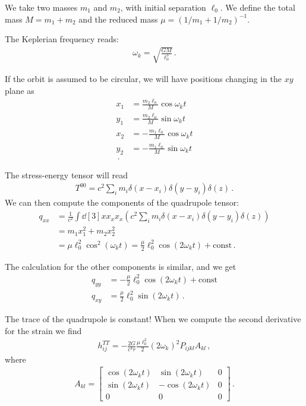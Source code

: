 \documentclass[main.tex]{subfiles}
\begin{document}
We take two masses \(m_1 \) and \(m_2 \), with initial separation \(\ell_0\). 
We define the total mass \(M = m_1 + m_2 \) and the reduced mass \(\mu = (1/m_1 + 1/m_2 )^{-1}\). 

The Keplerian frequency reads: 
%
\begin{align}
\omega _k = \sqrt{ \frac{GM}{\ell_0^3}}
\,.
\end{align}

If the orbit is assumed to be circular, we will have positions changing in the \(xy\) plane
as 
%
\begin{align}
x_1 &= \frac{m_2 \ell_0 }{M} \cos \omega _k t \\
y_1 &= \frac{m_2 \ell_0 }{M} \sin \omega _k t \\
x_2 &= -\frac{m_1 \ell_0 }{M} \cos \omega _k t \\
y_2 &= -\frac{m_1 \ell_0 }{M} \sin \omega _k t \\
\,.
\end{align}

The stress-energy tensor will read 
%
\begin{align}
T^{00} = c^2 \sum _{i} m_i \delta(x - x_i) \delta (y- y_i) \delta (z)
\,.
\end{align}
%
We can then compute the components of the quadrupole tensor:
%
\begin{align}
q_{xx} &= \frac{1}{c^2} \int \dd[3]{x} x_x x_x \left( c^2 \sum _{i} m_i \delta(x - x_i) \delta (y- y_i) \delta (z) \right)  \\
&= m_1 x_1^2 + m_2 x_2^2  \\
&= \mu \ell_0^2 \cos^2 (\omega _k t) = \frac{\mu}{2} \ell_0^2 \cos( 2 \omega _k t) + \text{const}
\,.
\end{align}

The calculation for the other components is similar, and we get 
%
\begin{align}
q_{yy} &= -\frac{\mu}{2} \ell_0^2 \cos(2 \omega _k t)  + \text{const}  \\
q_{xy} &= \frac{\mu}{2} \ell_{0}^2 \sin(2 \omega _k t)
\,.
\end{align}

The trace of the quadrupole is constant! 
When we compute the second derivative for the strain we find 
%
\begin{align}
h^{TT}_{ij} = - \frac{2G}{c^{4}r } \frac{\mu \ell_0^2}{2} (2 \omega _k)^2 P_{ijkl}A_{kl}
\,,
\end{align}
%
where 
%
\begin{align}
A_{kl} = \left[\begin{array}{ccc}
\cos(2 \omega _k t) & \sin(2 \omega _k t) & 0 \\ 
\sin(2 \omega _k t) & - \cos(2 \omega _k t) & 0 \\ 
0 & 0 & 0
\end{array}\right]
\,.
\end{align}
\end{document}
